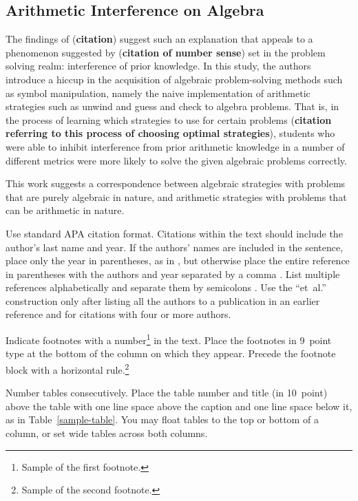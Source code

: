 \documentclass[10pt,letterpaper]{article}
\begin{document}
\subsection{Arithmetic Interference on Algebra}

The findings of (\textbf{citation}) suggest such an explanation that appeals to a phenomenon suggested by (\textbf{citation of number sense}) set in the problem solving realm: interference of prior knowledge. In this study, the authors introduce a hiccup in the acquisition of algebraic problem-solving methods such as symbol manipulation, namely the naive implementation of arithmetic strategies such as unwind and guess and check to algebra problems. That is, in the process of learning which strategies to use for certain problems (\textbf{citation referring to this process of choosing optimal strategies}), students who were able to inhibit interference from prior arithmetic knowledge in a number of different metrics were more likely to solve the given algebraic problems correctly.

This work suggests a correspondence between algebraic strategies with problems that are purely algebraic in nature, and arithmetic strategies with problems that can be arithmetic in nature.


Use standard APA citation format. Citations within the text should
include the author's last name and year. If the authors' names are
included in the sentence, place only the year in parentheses, as in
, but otherwise place the entire reference in
parentheses with the authors and year separated by a comma
. List multiple references alphabetically and
separate them by semicolons
. Use the
``et~al.'' construction only after listing all the authors to a
publication in an earlier reference and for citations with four or
more authors.

Indicate footnotes with a number\footnote{Sample of the first
footnote.} in the text. Place the footnotes in 9~point type at the
bottom of the column on which they appear. Precede the footnote block
with a horizontal rule.\footnote{Sample of the second footnote.}

Number tables consecutively. Place the table number and title (in
10~point) above the table with one line space above the caption and
one line space below it, as in Table~\ref{sample-table}. You may float
tables to the top or bottom of a column, or set wide tables across
both columns.
\end{document}
